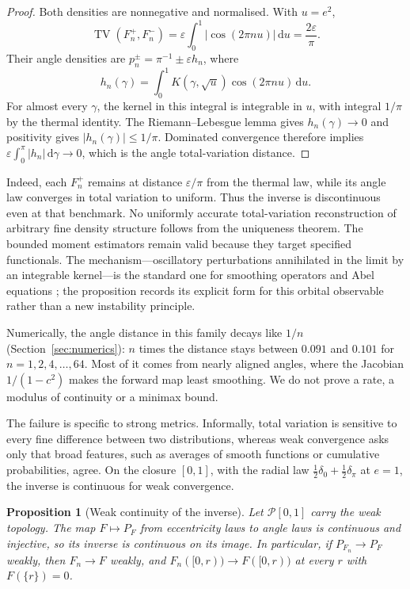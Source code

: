 \documentclass[11pt,a4paper]{article}
\newtheorem{proposition}[theorem]{Proposition}
\theoremstyle{remark}\newtheorem{remark}[theorem]{Remark}
\DeclareMathOperator{\TV}{TV}
\newcommand{\dd}{\,\mathrm d}
\begin{document}
\begin{proof}
Both densities are nonnegative and normalised. With $u=e^2$,
\begin{equation}
\TV(F_n^+,F_n^-)=\varepsilon\int_0^1|\cos(2\pi n u)|\dd u
=\frac{2\varepsilon}{\pi}.
\end{equation}
Their angle densities are $p_n^{\pm}=\pi^{-1}\pm\varepsilon h_n$, where
\begin{equation}
h_n(\gamma)=\int_0^1K(\gamma,\sqrt u)\cos(2\pi n u)\dd u.
\end{equation}
For almost every $\gamma$, the kernel in this integral is integrable in $u$, with integral $1/\pi$ by the thermal identity. The Riemann--Lebesgue lemma gives $h_n(\gamma)\to0$ and positivity gives $|h_n(\gamma)|\le1/\pi$. Dominated convergence therefore implies $\varepsilon\int_0^\pi|h_n|\dd\gamma\to0$, which is the angle total-variation distance.
\end{proof}

Indeed, each $F_n^+$ remains at distance $\varepsilon/\pi$ from the thermal law, while its angle law converges in total variation to uniform. Thus the inverse is discontinuous even at that benchmark. No uniformly accurate total-variation reconstruction of arbitrary fine density structure follows from the uniqueness theorem. The bounded moment estimators remain valid because they target specified functionals. The mechanism---oscillatory perturbations annihilated in the limit by an integrable kernel---is the standard one for smoothing operators and Abel equations \citep{GorenfloVessella1991}; the proposition records its explicit form for this orbital observable rather than a new instability principle.

Numerically, the angle distance in this family decays like $1/n$ (Section~\ref{sec:numerics}): $n$ times the distance stays between $0.091$ and $0.101$ for $n=1,2,4,\ldots,64$. Most of it comes from nearly aligned angles, where the Jacobian $1/(1-c^2)$ makes the forward map least smoothing. We do not prove a rate, a modulus of continuity or a minimax bound.

The failure is specific to strong metrics. Informally, total variation is sensitive to every fine difference between two distributions, whereas weak convergence asks only that broad features, such as averages of smooth functions or cumulative probabilities, agree. On the closure $[0,1]$, with the radial law $\tfrac12\delta_0+\tfrac12\delta_\pi$ at $e=1$, the inverse is continuous for weak convergence.

\begin{proposition}[Weak continuity of the inverse]\label{prop:weak}
Let $\mathcal P[0,1]$ carry the weak topology. The map $F\mapsto P_F$ from eccentricity laws to angle laws is continuous and injective, so its inverse is continuous on its image. In particular, if $P_{F_n}\to P_F$ weakly, then $F_n\to F$ weakly, and $F_n([0,r))\to F([0,r))$ at every $r$ with $F(\{r\})=0$.
\end{proposition}
\end{document}

